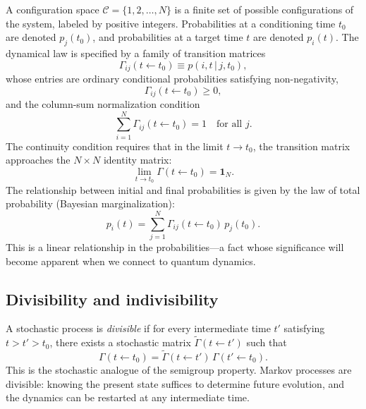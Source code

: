 \documentclass[aps,prd,twocolumn,superscriptaddress,nofootinbib]{revtex4-2}
\begin{document}
A configuration space $\mathcal{C} = \{1, 2, \ldots, N\}$ is a finite set of possible configurations of the system, labeled by positive integers. Probabilities at a conditioning time $t_0$ are denoted $p_j(t_0)$, and probabilities at a target time $t$ are denoted $p_i(t)$. The dynamical law is specified by a family of transition matrices
\begin{equation}
\Gamma_{ij}(t \leftarrow t_0) \equiv p(i,t \,|\, j,t_0),
\label{eq:transition}
\end{equation}
whose entries are ordinary conditional probabilities satisfying non-negativity,
\begin{equation}
\Gamma_{ij}(t \leftarrow t_0) \geq 0,
\label{eq:nonneg}
\end{equation}
and the column-sum normalization condition
\begin{equation}
\sum_{i=1}^{N} \Gamma_{ij}(t \leftarrow t_0) = 1 \quad \text{for all } j.
\label{eq:colsum}
\end{equation}
The continuity condition requires that in the limit $t \to t_0$, the transition matrix approaches the $N \times N$ identity matrix:
\begin{equation}
\lim_{t \to t_0} \Gamma(t \leftarrow t_0) = \mathbf{1}_N.
\label{eq:continuity}
\end{equation}
The relationship between initial and final probabilities is given by the law of total probability (Bayesian marginalization):
\begin{equation}
p_i(t) = \sum_{j=1}^{N} \Gamma_{ij}(t \leftarrow t_0)\, p_j(t_0).
\label{eq:marginalization}
\end{equation}
This is a linear relationship in the probabilities---a fact whose significance will become apparent when we connect to quantum dynamics.

\subsection{Divisibility and indivisibility}

A stochastic process is \emph{divisible} if for every intermediate time $t'$ satisfying $t > t' > t_0$, there exists a stochastic matrix $\tilde{\Gamma}(t \leftarrow t')$ such that
\begin{equation}
\Gamma(t \leftarrow t_0) = \tilde{\Gamma}(t \leftarrow t')\, \Gamma(t' \leftarrow t_0).
\label{eq:divisibility}
\end{equation}
This is the stochastic analogue of the semigroup property. Markov processes are divisible: knowing the present state suffices to determine future evolution, and the dynamics can be restarted at any intermediate time.
\end{document}
